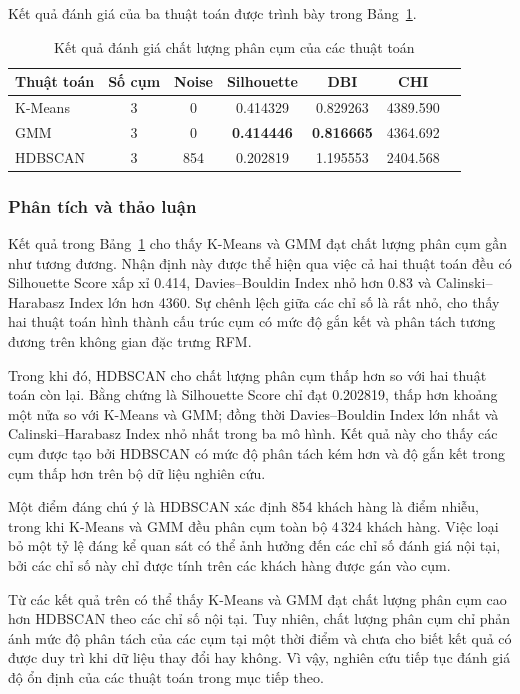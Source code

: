 \documentclass[12pt]{ai_conquer2026}
\begin{document}
Kết quả đánh giá của ba thuật toán được trình bày trong Bảng~\ref{tab:clustering_quality_result}.

\begin{table}[H]
\centering
\caption{Kết quả đánh giá chất lượng phân cụm của các thuật toán}
\label{tab:clustering_quality_result}
\renewcommand{\arraystretch}{1.2}
\begin{tabular}{lcccccc}
\toprule
\textbf{Thuật toán} &
\textbf{Số cụm} &
\textbf{Noise} &
\textbf{Silhouette} &
\textbf{DBI} &
\textbf{CHI} \\
\midrule
K-Means & 3 & 0 & 0.414329 & 0.829263 & 4389.590 \\
GMM & 3 & 0 & \textbf{0.414446} & \textbf{0.816665} & 4364.692 \\
HDBSCAN & 3 & 854 & 0.202819 & 1.195553 & 2404.568 \\
\bottomrule
\end{tabular}
\end{table}

\subsubsection{Phân tích và thảo luận}

Kết quả trong Bảng~\ref{tab:clustering_quality_result} cho thấy K-Means và GMM đạt chất lượng phân cụm gần như tương đương. Nhận định này được thể hiện qua việc cả hai thuật toán đều có Silhouette Score xấp xỉ 0.414, Davies--Bouldin Index nhỏ hơn 0.83 và Calinski--Harabasz Index lớn hơn 4360. Sự chênh lệch giữa các chỉ số là rất nhỏ, cho thấy hai thuật toán hình thành cấu trúc cụm có mức độ gắn kết và phân tách tương đương trên không gian đặc trưng RFM.

Trong khi đó, HDBSCAN cho chất lượng phân cụm thấp hơn so với hai thuật toán còn lại. Bằng chứng là Silhouette Score chỉ đạt 0.202819, thấp hơn khoảng một nửa so với K-Means và GMM; đồng thời Davies--Bouldin Index lớn nhất và Calinski--Harabasz Index nhỏ nhất trong ba mô hình. Kết quả này cho thấy các cụm được tạo bởi HDBSCAN có mức độ phân tách kém hơn và độ gắn kết trong cụm thấp hơn trên bộ dữ liệu nghiên cứu.

Một điểm đáng chú ý là HDBSCAN xác định 854 khách hàng là điểm nhiễu, trong khi K-Means và GMM đều phân cụm toàn bộ 4\,324 khách hàng. Việc loại bỏ một tỷ lệ đáng kể quan sát có thể ảnh hưởng đến các chỉ số đánh giá nội tại, bởi các chỉ số này chỉ được tính trên các khách hàng được gán vào cụm.

Từ các kết quả trên có thể thấy K-Means và GMM đạt chất lượng phân cụm cao hơn HDBSCAN theo các chỉ số nội tại. Tuy nhiên, chất lượng phân cụm chỉ phản ánh mức độ phân tách của các cụm tại một thời điểm và chưa cho biết kết quả có được duy trì khi dữ liệu thay đổi hay không. Vì vậy, nghiên cứu tiếp tục đánh giá độ ổn định của các thuật toán trong mục tiếp theo.
\end{document}
